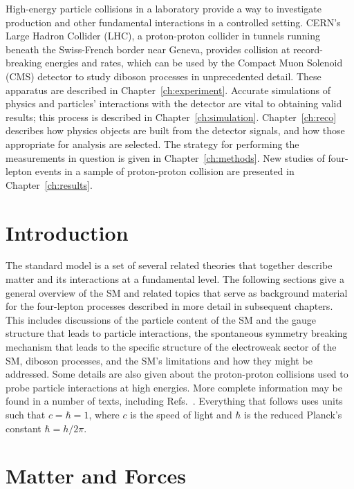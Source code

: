 High-energy particle collisions in a laboratory provide a way to investigate {\ZZ} production and other fundamental interactions in a controlled setting.
CERN's Large Hadron Collider (LHC), a proton-proton collider in tunnels running beneath the Swiss-French border near Geneva, provides collision at record-breaking energies and rates, which can be used by the Compact Muon Solenoid (CMS) detector to study diboson processes in unprecedented detail.
These apparatus are described in Chapter~\ref{ch:experiment}.
Accurate simulations of physics and particles' interactions with the detector are vital to obtaining valid results; this process is described in Chapter~\ref{ch:simulation}.
Chapter~\ref{ch:reco} describes how physics objects are built from the detector signals, and how those appropriate for analysis are selected.
The strategy for performing the {\ZZ} measurements in question is given in Chapter~\ref{ch:methods}.
New studies of four-lepton events in a sample of proton-proton collision are presented in Chapter~\ref{ch:results}.



\section{Introduction}

The standard model is a set of several related theories that together describe matter and its interactions at a fundamental level.
The following sections give a general overview of the SM and related topics that serve as background material for the four-lepton processes described in more detail in subsequent chapters.
This includes discussions of the particle content of the SM and the gauge structure that leads to particle interactions, the spontaneous symmetry breaking mechanism that leads to the specific structure of the electroweak sector of the SM, diboson processes, and the SM's limitations and how they might be addressed.
Some details are also given about the proton-proton collisions used to probe particle interactions at high energies.
More complete information may be found in a number of texts, including Refs.~\cite{Griffiths:111880,Halzen:1984mc,barger1997collider,Peskin:1995ev,Donoghue:238727}.
Everything that follows uses units such that $c = \hbar = 1$, where $c$ is the speed of light and $\hbar$ is the reduced Planck's constant $\hbar = h / 2\pi$.



\section{Matter and Forces}

